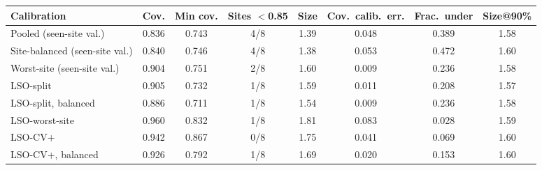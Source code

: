 \begin{tabular}{lccccccc}
\toprule
Calibration & Cov. & Min cov. & Sites $<$0.85 & Size & Cov.\ calib.\ err. & Frac.\ under & Size@90\% \\
\midrule
Pooled (seen-site val.) & 0.836 & 0.743 & 4/8 & 1.39 & 0.048 & 0.389 & 1.58 \\
Site-balanced (seen-site val.) & 0.840 & 0.746 & 4/8 & 1.38 & 0.053 & 0.472 & 1.60 \\
Worst-site (seen-site val.) & 0.904 & 0.751 & 2/8 & 1.60 & 0.009 & 0.236 & 1.58 \\
LSO-split & 0.905 & 0.732 & 1/8 & 1.59 & 0.011 & 0.208 & 1.57 \\
LSO-split, balanced & 0.886 & 0.711 & 1/8 & 1.54 & 0.009 & 0.236 & 1.58 \\
LSO-worst-site & 0.960 & 0.832 & 1/8 & 1.81 & 0.083 & 0.028 & 1.59 \\
LSO-CV+ & 0.942 & 0.867 & 0/8 & 1.75 & 0.041 & 0.069 & 1.60 \\
LSO-CV+, balanced & 0.926 & 0.792 & 1/8 & 1.69 & 0.020 & 0.153 & 1.60 \\
\bottomrule
\end{tabular}